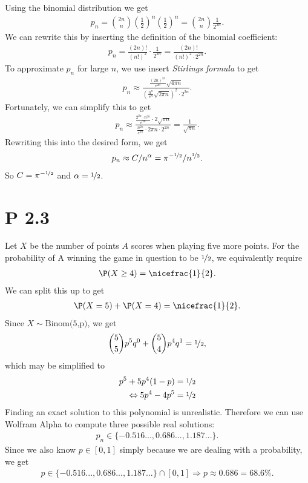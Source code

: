 \documentclass{article}
\begin{document}
Using the binomial distribution we get
\begin{align*}
	p_n = \binom{2n}{n}\left(\frac{1}{2}\right)^n\left(\frac{1}{2}\right)^n
	=\binom{2n}{n}\frac{1}{2^{2n}}.
\end{align*}
We can rewrite this by inserting the definition of the binomial
coefficient:
\begin{align*}
	p_n = \frac{(2n)!}{(n!)^2}\cdot\frac{1}{2^{2n}}=\frac{(2n)!}{(n!)^2\cdot 2^{2n}}.
\end{align*}
To approximate $p_n$ for large $n$, we use insert \emph{Stirlings formula}
to get
\begin{align*}
	p_n \approx \frac{
		\frac{(2n)^{2n}}{e^{2n}}\sqrt{4\pi n}
	}{
		\left(\frac{n^n}{e^n}\sqrt{2\pi n}\right)^2\cdot 2^{2n}}.
\end{align*}
Fortunately, we can simplify this to get
\begin{align*}
	p_n\approx \frac{
		\frac{2^{2n}\cdot n^{2n}}{e^{2n}}\cdot2\sqrt{\pi n}
	}{
		\frac{n^{2n}}{e^{2n}}\cdot 2\pi n\cdot 2^{2n}}=\frac{1}{\sqrt{\pi n}}.
\end{align*}
Rewriting this into the desired form, we get
\begin{align*}
	p_n\approx C / n^\alpha = \pi^{-\nicefrac{1}{2}}/n^{\nicefrac{1}{2}}.
\end{align*}
So $C=\pi^{-\nicefrac{1}{2}}$ and $\alpha=\nicefrac{1}{2}$.
\section*{P 2.3}
Let $X$ be the number of points $A$ scores when playing five more points.
For the probability of A winning the game in question
to be $\nicefrac{1}{2}$, we equivalently require
\begin{align*}
	\P(X\geq 4) = \nicefrac{1}{2}.
\end{align*}
We can split this up to get
\begin{align*}
	\P(X = 5) + \P(X = 4) = \nicefrac{1}{2}.
\end{align*}
Since $X\sim\text{Binom(5,p)}$, we get
\begin{align*}
	\binom{5}{5}p^5q^0+\binom{5}{4}p^4q^1=\nicefrac{1}{2},
\end{align*}
which may be simplified to
\begin{align*}
	p^5+5p^4(1-p)             & = \nicefrac{1}{2} \\
	\Leftrightarrow 5p^4-4p^5 & =\nicefrac{1}{2}
\end{align*}
Finding an exact solution to this polynomial is unrealistic.
Therefore we can use Wolfram Alpha to compute three possible real solutions:
\begin{align*}
	p_n \in \{-0.516..., 0.686..., 1.187...\}.
\end{align*}
Since we also know $p\in[0,1]$ simply because we are dealing with a
probability, we get
\begin{align*}
	p\in \{-0.516..., 0.686..., 1.187...\} \cap [0,1] \Rightarrow p \approx 0.686=68.6\%.
\end{align*}
\end{document}
